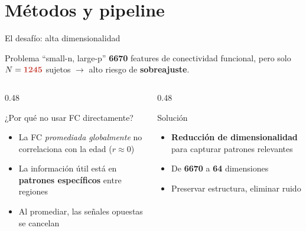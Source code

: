 \documentclass[aspectratio=169, 11pt]{beamer}
\newcommand{\highlight}[1]{\textcolor{uncaccent}{\textbf{#1}}}
\begin{document}
\section{Métodos y pipeline}

\begin{frame}{El desafío: alta dimensionalidad}
  \begin{alertblock}{Problema ``small-n, large-p''}
    \highlight{6670} features de conectividad funcional, pero solo $N = \highlight{1245}$ sujetos $\rightarrow$ alto riesgo de \textbf{sobreajuste}.
  \end{alertblock}

  \vspace{0.3cm}
  \begin{columns}[T]
    \begin{column}{0.48\textwidth}
      \begin{block}{¿Por qué no usar FC directamente?}
        {\small
        \begin{itemize}\setlength{\itemsep}{3pt}
          \item La FC \textit{promediada globalmente} no correlaciona con la edad ($r \approx 0$)
          \item La información útil está en \highlight{patrones específicos} entre regiones
          \item Al promediar, las señales opuestas se cancelan
        \end{itemize}}
      \end{block}
    \end{column}
    \begin{column}{0.48\textwidth}
      \begin{block}{Solución}
        {\small
        \begin{itemize}\setlength{\itemsep}{3pt}
          \item \textbf{Reducción de dimensionalidad} para capturar patrones relevantes
          \item De \highlight{6670} a \highlight{64} dimensiones
          \item Preservar estructura, eliminar ruido
        \end{itemize}}
      \end{block}
    \end{column}
  \end{columns}
\end{frame}
\end{document}
